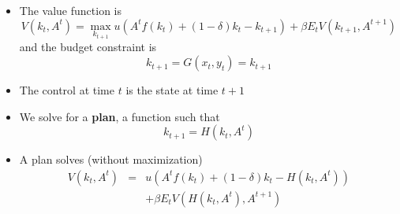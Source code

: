 \documentclass[notes=show]{beamer}
\begin{document}
\begin{frame}%


\begin{itemize}
\item The value function is%
\[
V(k_{t},A^{t})=\max_{k_{t+1}}u(A^{t}f(k_{t})+(1-\delta )k_{t}-k_{t+1})+\beta
E_{t}V\left( k_{t+1},A^{t+1}\right) 
\]%
and the budget constraint is%
\[
k_{t+1}=G(x_{t},y_{t})=k_{t+1} 
\]

\item The control at time $t$ is the state at time $t+1$

\item We solve for a \textbf{plan}, a function such that 
\[
k_{t+1}=H(k_{t},A^{t}) 
\]

\item A plan solves (without maximization)%
\begin{eqnarray*}
V(k_{t},A^{t}) &=&u(A^{t}f(k_{t})+(1-\delta )k_{t}-H(k_{t},A^{t})) \\
&&+\beta E_{t}V\left( H(k_{t},A^{t}),A^{t+1}\right)
\end{eqnarray*}
\end{itemize}

\end{frame}%
\end{document}
